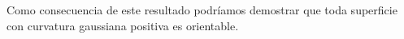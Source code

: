 Como consecuencia de este resultado podríamos demostrar que toda superficie con
curvatura gaussiana positiva es orientable. 

%





